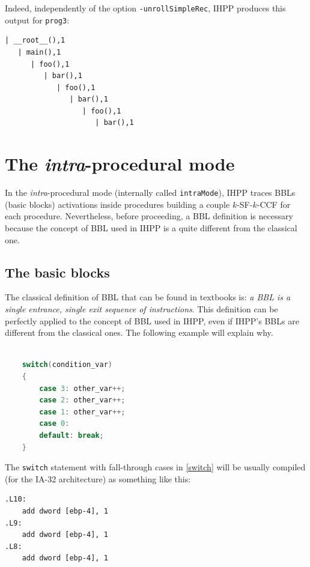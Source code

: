 \documentclass[a4paper,10pt]{report}
\begin{document}
\noindent
Indeed, independently of the option \verb|-unrollSimpleRec|, 
IHPP produces this output for \verb|prog3|:
\begin{lstlisting}[label=out7, caption={IHPP partial output for \texttt{prog3}},frame=bottomline]
| __root__(),1
   | main(),1
      | foo(),1
         | bar(),1
            | foo(),1
               | bar(),1
                  | foo(),1
                     | bar(),1

\end{lstlisting}


\section{The \emph{intra}-procedural mode}

In the \emph{intra}-procedural mode (internally called \verb|intraMode|), 
IHPP traces BBLs (basic blocks) activations inside procedures building a couple $k$-SF-$k$-CCF for each procedure. Nevertheless, before proceeding, a BBL definition is necessary 
because the concept of BBL used in IHPP is a quite different from the classical one.

\subsection{The basic blocks}
The classical definition of BBL that can be found in textbooks is: \emph{a BBL is a single entrance, single exit sequence of instructions}. 
This definition can be perfectly applied to the concept of BBL used in IHPP, 
even if IHPP's BBLs are different from the classical ones. 
The following example will explain why.

\begin{lstlisting}[language=C, 
	caption={a switch statement}, label=switch, frame=leftline]

    switch(condition_var)
    {
        case 3: other_var++;
        case 2: other_var++;
        case 1: other_var++;
        case 0:
        default: break;
    }

\end{lstlisting}

\noindent
The \verb|switch| statement with fall-through cases in \cref{switch} 
will be usually compiled (for the IA-32 architecture) as something like this:

\begin{lstlisting}[language={[x86masm]Assembler}, 
	frame=leftline, label=asm1, caption={assembly code relative to \cref{switch}}]
.L10:
	add dword [ebp-4], 1
.L9:
	add dword [ebp-4], 1
.L8:
	add dword [ebp-4], 1
\end{lstlisting}
\end{document}
